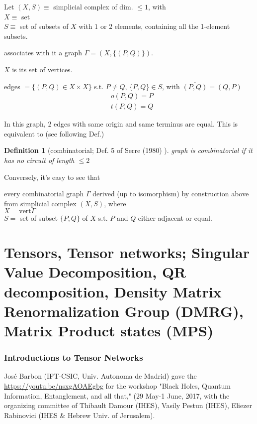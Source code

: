 \documentclass[10pt]{amsart}
\newtheorem{definition}{Definition}
\begin{document}
\begin{multicols*}{2}
Let $(X,S)\equiv $ simplicial complex of dim. $\leq 1$, with \\
$X \equiv $ set \\
$S \equiv $ set of subsets of $X$ with $1$ or $2$ elements, containing all the 1-element subsets.  

associates with it a graph $\Gamma = (X, \lbrace (P,Q) \rbrace)$.  

$X$ is its set of vertices.  

edges $=\lbrace (P,Q)\in X\times X\rbrace$ s.t. $P\neq Q$, $\lbrace P ,Q \rbrace \in S$, with $\overline{(P,Q)} = (Q,P)$
\[
\begin{aligned}
& o(P,Q) = P \\
& t(P,Q) = Q
\end{aligned}
\]

In this graph, 2 edges with same origin and same terminus are equal.  This is equivalent to (see following Def.)

\begin{definition}[combinatorial; Def. 5 of Serre (1980) \cite{Serr1980}]
	graph is combinatorial if it has no circuit of length $\leq 2$
\end{definition}
Conversely, it's easy to see that 

every combinatorial graph $\Gamma$ derived (up to isomorphism) by construction above from simplicial complex $(X,S)$, where \\
$X = \text{vert} \Gamma$ \\
$S=$ set of subset $\lbrace P,Q \rbrace$ of $X$ s.t. $P$ and $Q$ either adjacent or equal. 

\part{Tensors, Tensor networks; Singular Value Decomposition, QR decomposition, Density Matrix Renormalization Group (DMRG), Matrix Product states (MPS)}

\section{Introductions to Tensor Networks}

Jos\'{e} Barbon (IFT-CSIC, Univ. Autonoma de Madrid) gave the \href{Workshop introductory overview}{https://youtu.be/nsxgAOAEgbg} for the workshop "Black Holes, Quantum Information, Entanglement, and all that," (29 May-1 June, 2017, with the organizing committee of Thibault Damour (IHES), Vasily Pestun (IHES), Eliezer Rabinovici (IHES \& Hebrew Univ. of Jerusalem).  


\end{multicols*}
\end{document}
